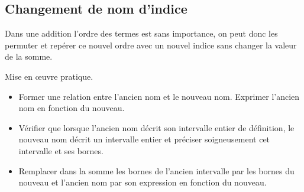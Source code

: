 \subsection{Changement de nom d'indice}
Dans une addition l'ordre des termes est sans importance, on peut donc les permuter et repérer ce nouvel ordre avec un nouvel indice sans changer la valeur de la somme.

Mise en \oe{}uvre pratique.
\begin{itemize}
  \item Former une relation entre l'ancien nom et le nouveau nom. Exprimer l'ancien nom en fonction du nouveau.
  \item Vérifier que lorsque l'ancien nom décrit son intervalle entier de définition, le nouveau nom décrit un intervalle entier et préciser soigneusement cet intervalle et ses bornes.
  \item Remplacer dans la somme les bornes de l'ancien intervalle par les bornes du nouveau et l'ancien nom par son expression en fonction du nouveau.
\end{itemize}

